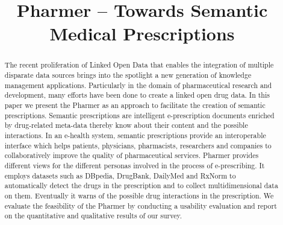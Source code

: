 \documentclass[10pt, conference, compsocconf]{IEEEtran}
\begin{document}
\title{Pharmer -- Towards Semantic Medical Prescriptions}



\author{
\and
{}
}


\maketitle

\begin{abstract}
The recent proliferation of Linked Open Data that enables the integration of multiple disparate data sources brings into the spotlight a new generation of knowledge management applications.
Particularly in the domain of pharmaceutical research and development, many efforts have been done to create a linked open drug data.
In this paper we present the Pharmer as an approach to facilitate the creation of semantic prescriptions.
Semantic prescriptions are intelligent e-prescription documents enriched by drug-related meta-data thereby know about their content and the possible interactions.
In an e-health system, semantic prescriptions provide an interoperable interface which helps patients, physicians, pharmacists, researchers and companies to collaboratively improve the quality of pharmaceutical services.
Pharmer provides different views for the different personas involved in the process of e-prescribing.
It employs datasets such as DBpedia, DrugBank, DailyMed and RxNorm to automatically detect the drugs in the prescription and to collect multidimensional data on them.
Eventually it warns of the possible drug interactions in the prescription.
We evaluate the feasibility of the Pharmer by conducting a usability evaluation and report on the quantitative and qualitative results of our survey.
\end{abstract}
\end{document}
